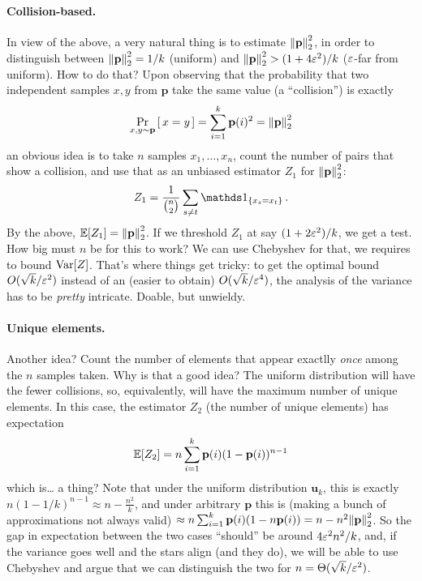 \documentclass[10pt]{article}
\newcommand{\dst}{\eps}
\newcommand{\ab}{k}
\newcommand{\ns}{n}
\newcommand{\p}{\mathbf{p}}
\renewcommand{\uniform}{\mathbf{u}}
\begin{document}
\paragraph{Collision-based.} In view of the above, a very natural thing is to estimate $\normtwo{\p}^2$, in order to distinguish between $\normtwo{\p}^2 = 1/\ab$ (uniform) and $\normtwo{\p}^2 > (1+4\dst^2)/\ab$ ($\dst$-far from uniform). How to do that? Upon observing that the probability that two independent samples $x,y$ from $\p$ take the same value (a ``collision'') is exactly
\begin{equation}
    \probaDistrOf{x,y\sim\p}{x=y} = \sum_{i=1}^\ab \p(i)^2 = \normtwo{\p}^2
\end{equation}
an obvious idea is to take $\ns$ samples $x_1,\dots,x_\ns$, count the number of pairs that show a collision, and use that as an unbiased estimator $Z_1$ for $\normtwo{\p}^2$:
\begin{equation}
    Z_1 = \frac{1}{\binom{\ns}{2}} \sum_{s\neq t} \indic{x_s=x_t}\,.
\end{equation}
By the above, $\expect{Z_1} = \normtwo{\p}^2$. If we threshold $Z_1$ at say $(1+2\dst^2)/\ab$, we get a test. How big must $\ns$ be for this to work? We can use Chebyshev for that, we requires to bound $\operatorname{Var}[Z]$. That's where things get tricky: to get the optimal bound $O(\sqrt{\ab}/\dst^2)$ instead of an (easier to obtain) $O(\sqrt{\ab}/\dst^4)$, the analysis of the variance has to be \emph{pretty} intricate. Doable, but unwieldy.

\paragraph{Unique elements.} Another idea? Count the number of elements that appear exactlly \emph{once} among the $\ns$ samples taken. Why is that a good idea? The uniform distribution will have the fewer collisions, so, equivalently, will have the maximum number of unique elements. In this case, the estimator $Z_2$ (the number of unique elements) has expectation
\begin{equation}
  \expect{Z_2} = \ns \sum_{i=1}^\ab \p(i)(1-\p(i))^{\ns-1}
\end{equation}
which is\dots{} a thing? Note that under the uniform distribution $\uniform_\ab$, this is exactly $\ns (1-1/\ab)^{\ns-1}\approx \ns - \frac{\ns^2}{\ab}$, and under arbitrary $\p$ this is (making a bunch of approximations not always valid) $\approx \ns \sum_{i=1}^\ab \p(i)(1-\ns\p(i)) = \ns - \ns^2\normtwo{\p}^2$. So the gap in expectation between the two cases ``should'' be around $4\dst^2\ns^2/\ab$, and, if the variance goes well and the stars align (and they do), we will be able to use Chebyshev and argue that we can distinguish the two for $\ns=\Theta(\sqrt{\ab}/\dst^2)$.
\end{document}

